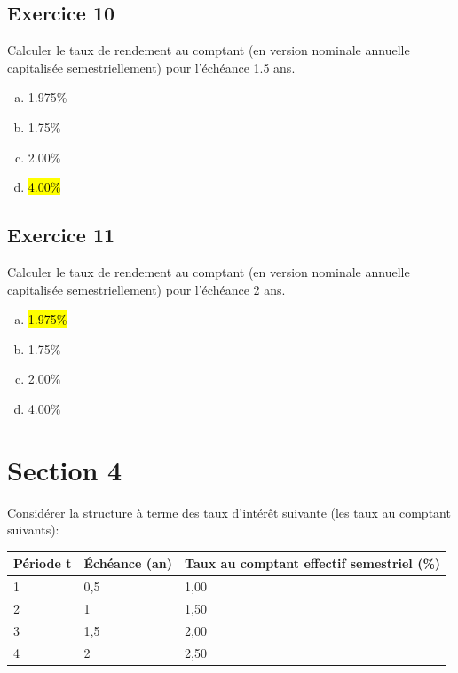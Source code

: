 \documentclass[10pt,a4paper]{article}
\begin{document}
\subsection*{Exercice 10}
Calculer le taux de rendement au comptant (en version nominale annuelle capitalisée semestriellement) pour l'échéance 1.5 ans.

\begin{enumerate}[a)]
\item 1.975\%
\item 1.75\%
\item 2.00\%
\item  \hl{4.00\%}
\end{enumerate}


\subsection*{Exercice 11}
Calculer le taux de rendement au comptant (en version nominale annuelle capitalisée semestriellement) pour l'échéance 2 ans.

\begin{enumerate}[a)]
\item  \hl{1.975\%}
\item 1.75\%
\item 2.00\%
\item 4.00\%
\end{enumerate}

\newpage

\section*{Section 4}
Considérer la structure à terme des taux d'intérêt suivante (les taux au comptant suivants):

\begin{table}[H]
\begin{center}
\begin{tabular}{|l|l|l|}
\hline
Période t & Échéance (an) & Taux au comptant effectif semestriel (\%) \\ \hline
1         & 0,5           & 1,00                                      \\ \hline
2         & 1             & 1,50                                      \\ \hline
3         & 1,5           & 2,00                                      \\ \hline
4         & 2             & 2,50                                      \\ \hline
\end{tabular}
\end{center}
\end{table}
\end{document}
